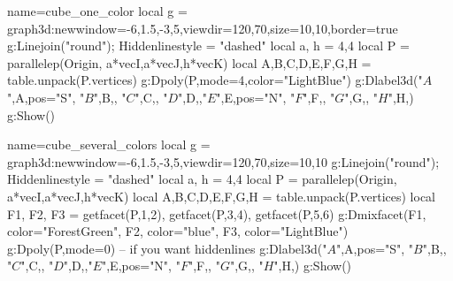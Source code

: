 \documentclass[12pt]{standalone}
\begin{document}
\begin{luadraw}{name=cube_one_color}
local g = graph3d:new{window={-6,1.5,-3,5},viewdir={120,70},size={10,10},border=true}
g:Linejoin("round"); Hiddenlinestyle = "dashed"
local a, h = 4,4
local P = parallelep(Origin, a*vecI,a*vecJ,h*vecK)
local A,B,C,D,E,F,G,H = table.unpack(P.vertices)
g:Dpoly(P,{mode=4,color="LightBlue"})
g:Dlabel3d("$A$",A,{pos="S"}, "$B$",B,{}, "$C$",C,{}, "$D$",D,{},"$E$",E,{pos="N"}, "$F$",F,{}, "$G$",G,{}, "$H$",H,{})
g:Show()
\end{luadraw}

\begin{luadraw}{name=cube_several_colors}
local g = graph3d:new{window={-6,1.5,-3,5},viewdir={120,70},size={10,10}}
g:Linejoin("round"); Hiddenlinestyle = "dashed"
local a, h = 4,4
local P = parallelep(Origin, a*vecI,a*vecJ,h*vecK)
local A,B,C,D,E,F,G,H = table.unpack(P.vertices)
local F1, F2, F3 = getfacet(P,{1,2}), getfacet(P,{3,4}), getfacet(P,{5,6})
g:Dmixfacet(F1, {color="ForestGreen"}, F2, {color="blue"}, F3, {color="LightBlue"})
g:Dpoly(P,{mode=0}) -- if you want hiddenlines
g:Dlabel3d("$A$",A,{pos="S"}, "$B$",B,{}, "$C$",C,{}, "$D$",D,{},"$E$",E,{pos="N"}, "$F$",F,{}, "$G$",G,{}, "$H$",H,{})
g:Show()
\end{luadraw}
 
\end{document}
